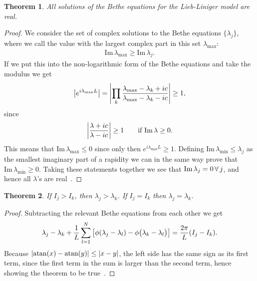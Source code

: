 \documentclass[11pt, a4paper]{report} %
\newtheorem{theorem}{Theorem}
\begin{document}
\begin{theorem}
All solutions of the Bethe equations for the Lieb-Liniger model are real.
\end{theorem}

\begin{proof}
We consider the set of complex solutions to the Bethe equations \(\{\lambda_j\}\), where we call the value with the largest complex part in this set \(\lambda_{\max}\):
\begin{align}
\textrm{Im} \, \lambda_{\max} \geq \textrm{Im} \, \lambda_j.
\end{align}
If we put this into the non-logarithmic form of the Bethe equations and take the modulus we get
\begin{align}
  \abs{e^{i\lambda_{\max} L}}= \abs{\prod_k \frac{\lambda_{\max} - \lambda_k + ic}{\lambda_{\max} - \lambda_k - ic}}\geq 1,
\end{align}
since
\begin{align}
\abs{\frac{\lambda+ic}{\lambda-ic}} \geq 1 \qquad \textrm{if Im}\, \lambda \geq 0.
\end{align}
This means that \(\textrm{Im}\, \lambda_{\max} \leq 0\) since only then \(e^{i\lambda_{\max}L} \geq 1\).
Defining \(\textrm{Im}\,\lambda_{\min}\leq \lambda_j\) as the smallest imaginary part of a rapidity we can in the same way prove that \(\textrm{Im}\,\lambda_{\min} \geq 0\).
Taking these statements together we see that \(\textrm{Im}\, \lambda_{j}=0\textrm{\,}\forall\textrm{\,} j\), and hence all  \(\lambda\)'s are real~\cite{Korepin1993}.
\end{proof}

\begin{theorem}\label{th:equalisequal}
If \(I_j >I_k\), then \(\lambda_j > \lambda_k\). If \(I_j=I_k\) then \(\lambda_j=\lambda_k\).
\end{theorem}

\begin{proof}
Subtracting the relevant Bethe equations from each other we get
\begin{align}
  \lambda_j - \lambda_k + \frac{1}{L}\sum_{l=1}^N \left[\phi\qty(\lambda_j - \lambda_l) - \phi\qty\big(\lambda_k - \lambda_l) \right] = \frac{2\pi}{L} \qty(I_j - I_k).
\end{align}
Because \(\abs{\atan(x)-\atan(y)}\leq\abs{x-y}\), the left side has the same sign as its first term, since the first term in the sum is larger than the second term, hence showing the theorem to be true~\cite{Korepin1993,Gaudin2009}.
\end{proof}
\end{document}
